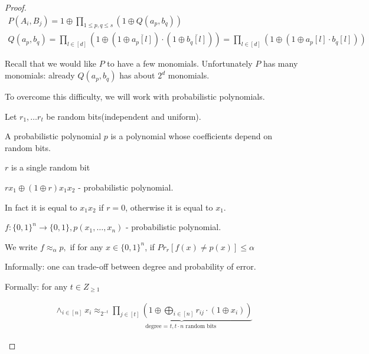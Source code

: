 \begin{proof}
	\begin{align*}
		P(A_i, B_j) = 1 \oplus \prod_{1 \leq p, q \leq s} (1 \oplus Q(a_p, b_q))\\
		Q(a_p, b_q) = \prod_{l \in [d]} (1 \oplus (1 \oplus \overline{a_p[l]}) \cdot (1 \oplus \overline {b_q[l]})) = \prod_{l \in [d]} (1 \oplus (1 \oplus a_p[l] \cdot b_q[l]))
	\end{align*}

	Recall that we would like $P$ to have a few monomials.
	Unfortunately $P$ has many monomials: already $Q(a_p, b_q)$ has about $2^{d}$ monomials.

	To overcome this difficulty, we will work with probabilistic polynomials.

	\begin{df}

		Let $r_1, \dots r_t$ be random bits(independent and uniform).

		A probabilistic polynomial $p$ is a polynomial whose coefficients depend on random bits.
	\end{df}

	\begin{exmpl}
		$r$ is a single random bit

		$r x_1 \oplus (1 \oplus r) x_1 x_2$ - probabilistic polynomial.

		In fact it is equal to $x_1 x_2$ if $r = 0$, otherwise it is equal to $x_1$.
	\end{exmpl}

	\begin{df}

		$f:\{0, 1\}^{n} \to \{0, 1\}, p(x_1, \dots, x_n)$  - probabilistic polynomial.

		We write $f \approx_\alpha p,$ if for any $x \in \{0, 1\}^{n}$, if $Pr_r[f(x) \neq p(x)] \leq \alpha$

	\end{df}

	\begin{lm}

		Informally: one can trade-off between degree and probability of error.

		Formally: for any $t \in Z_{\geq 1}$

		\begin{align*}
			\land_{i \in [n]} x_i \approx_{2^{-t}} \underbrace{\prod_{j \in [t]}(1 \oplus \bigoplus_{i \in [n]} r_{i j} \cdot (1 \oplus x_i))}_{\text{degree = } t, t \cdot n \text{ random bits }}
		\end{align*}


\end{lm}
\end{proof}
